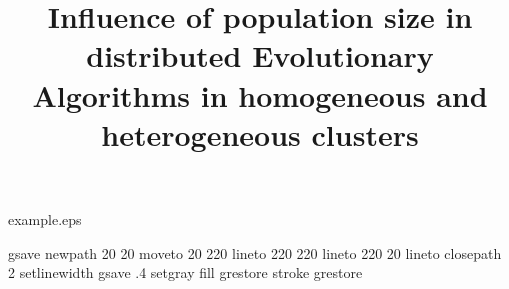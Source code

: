 %
%
%
%
%
\begin{filecontents*}{example.eps}





gsave
newpath
  20 20 moveto
  20 220 lineto
  220 220 lineto
  220 20 lineto
closepath
2 setlinewidth
gsave
  .4 setgray fill
grestore
stroke
grestore
\end{filecontents*}
%
\RequirePackage{fix-cm}
%
\documentclass[twocolumn]{svjour3}          %
%
\smartqed  %
%
\usepackage{graphicx}
\usepackage{color}
\usepackage{listings}
\usepackage{fancyvrb}
\usepackage{url}
\usepackage{fix2col}
\usepackage{epsfig}
\usepackage{algorithm}
\usepackage{algorithmic}
%

\lstset{
basicstyle=\ttfamily \scriptsize,
language=java,
frame=single,
stringstyle=\ttfamily,
showstringspaces=false
}

%
%
%
%
%
\providecommand{\e}[1]{\ensuremath{\times 10^{#1}}}


\title{Influence of population size in distributed Evolutionary Algorithms in homogeneous and heterogeneous clusters%
}

